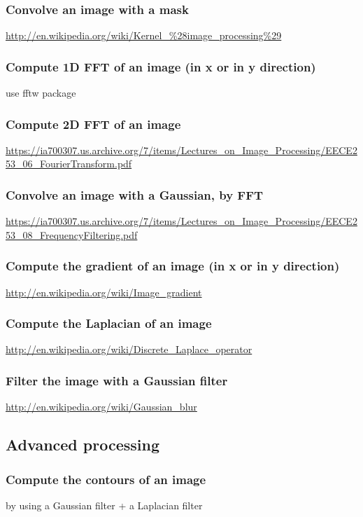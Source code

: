 \documentclass[10pt,a4paper]{article}
\begin{document}
\subsubsection{Convolve an image with a mask}
\url{http://en.wikipedia.org/wiki/Kernel_%28image_processing%29}

  \subsubsection{Compute 1D FFT of an image (in x or in y direction)}
  use fftw package

  \subsubsection{Compute 2D FFT of an image}
  \url{https://ia700307.us.archive.org/7/items/Lectures_on_Image_Processing/EECE253_06_FourierTransform.pdf}

  \subsubsection{Convolve an image with a Gaussian, by FFT}
  \url{https://ia700307.us.archive.org/7/items/Lectures_on_Image_Processing/EECE253_08_FrequencyFiltering.pdf}

  \subsubsection{Compute the gradient of an image (in x or in y direction)}
  \url{http://en.wikipedia.org/wiki/Image_gradient}

  \subsubsection{Compute the Laplacian of an image}
  \url{http://en.wikipedia.org/wiki/Discrete_Laplace_operator}

  \subsubsection{Filter the image with a Gaussian filter}
  \url{http://en.wikipedia.org/wiki/Gaussian_blur}

  \subsection{Advanced processing}

  \subsubsection{Compute the contours of an image}
  by using a Gaussian filter + a Laplacian filter
\end{document}
